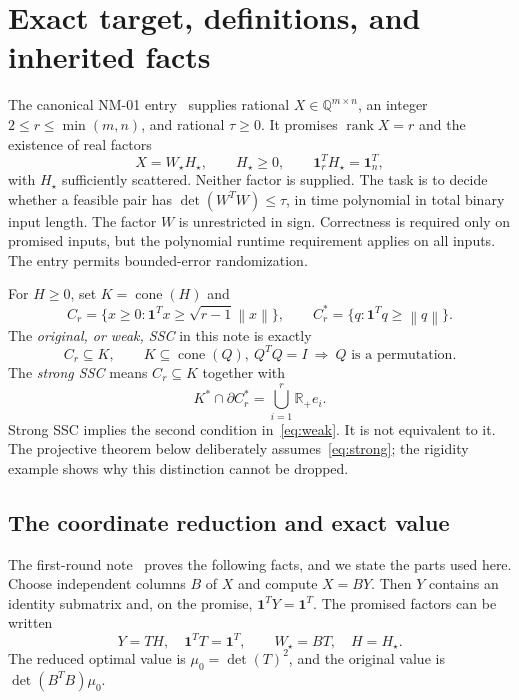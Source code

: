 \documentclass[11pt]{article}
\theoremstyle{definition}\newtheorem{definition}[theorem]{Definition}
\newcommand{\R}{\mathbb R}\newcommand{\Q}{\mathbb Q}\newcommand{\Z}{\mathbb Z}
\newcommand{\e}{\mathbf1}\newcommand{\cone}{\operatorname{cone}}
\newcommand{\rank}{\operatorname{rank}}\newcommand{\poly}{\operatorname{poly}}
\newcommand{\norm}[1]{\left\lVert#1\right\rVert}\newcommand{\Tr}{\mathcal T}
\begin{document}
\newpage
\tableofcontents
\newpage

\section{Exact target, definitions, and inherited facts}
\label{sec:target}
The canonical NM-01 entry~\cite{repo} supplies rational $X\in\Q^{m\times n}$, an integer $2\le r\le\min(m,n)$, and rational $\tau\ge0$. It promises $\rank X=r$ and the existence of real factors
\begin{equation}
 X=W_\star H_\star,\qquad H_\star\ge0,\qquad \e_r^T H_\star=\e_n^T,
 \label{eq:factor}
\end{equation}
with $H_\star$ sufficiently scattered. Neither factor is supplied. The task is to decide whether a feasible pair has $\det(W^TW)\le\tau$, in time polynomial in total binary input length. The factor $W$ is unrestricted in sign. Correctness is required only on promised inputs, but the polynomial runtime requirement applies on all inputs. The entry permits bounded-error randomization.

For $H\ge0$, set $K=\cone(H)$ and
\begin{equation}
 C_r=\{x\ge0:\e^Tx\ge\sqrt{r-1}\norm{x}\},\qquad
 C_r^*=\{q:\e^Tq\ge\norm{q}\}.
\end{equation}
The \emph{original, or weak, SSC} in this note is exactly
\begin{equation}
 C_r\subseteq K,\qquad
 K\subseteq\cone(Q),\ Q^TQ=I\ \Longrightarrow\ Q\text{ is a permutation}.
 \label{eq:weak}
\end{equation}
The \emph{strong SSC} means $C_r\subseteq K$ together with
\begin{equation}
 K^*\cap\partial C_r^*=\bigcup_{i=1}^r\R_+e_i.
 \label{eq:strong}
\end{equation}
Strong SSC implies the second condition in~\eqref{eq:weak}. It is not equivalent to it. The projective theorem below deliberately assumes~\eqref{eq:strong}; the rigidity example shows why this distinction cannot be dropped.

\subsection{The coordinate reduction and exact value}
The first-round note~\cite{previous} proves the following facts, and we state the parts used here. Choose independent columns $B$ of $X$ and compute $X=BY$. Then $Y$ contains an identity submatrix and, on the promise, $\e^TY=\e^T$. The promised factors can be written
\begin{equation}
 Y=TH,\quad \e^TT=\e^T,\qquad
 W_\star=BT,\quad H=H_\star.
 \label{eq:reduced}
\end{equation}
The reduced optimal value is $\mu_0=\det(T)^2$, and the original value is $\det(B^TB)\mu_0$.
\end{document}
